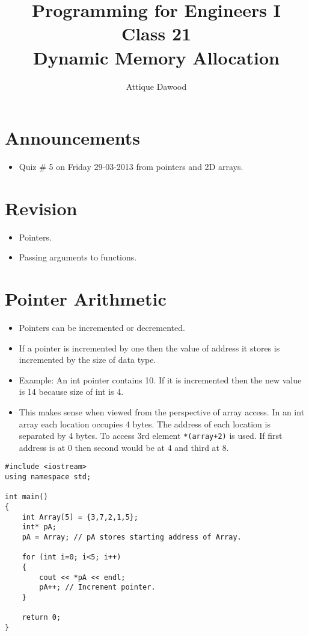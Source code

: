 \documentclass[12pt,a4paper]{article}
\title{\vspace{-2cm}Programming for Engineers I\\Class 21\\Dynamic Memory Allocation}
\author{Attique Dawood}
\begin{document}
\maketitle
\section{Announcements}
\begin{itemize}
\item Quiz \# 5 on Friday 29-03-2013 from pointers and 2D arrays.
\end{itemize}
\section{Revision}
\begin{itemize}
\item Pointers.
\item Passing arguments to functions.
\end{itemize}
\section{Pointer Arithmetic}
\begin{itemize}
\item Pointers can be incremented or decremented.
\item If a pointer is incremented by one then the value of address it stores is incremented by the size of data type.
\item Example: An int pointer contains 10. If it is incremented then the new value is 14 because size of int is 4.
\item This makes sense when viewed from the perspective of array access. In an int array each location occupies 4 bytes. The address of each location is separated by 4 bytes. To access 3rd element \verb|*(array+2)| is used. If first address is at 0 then second would be at 4 and third at 8.
\end{itemize} 
\begin{lstlisting}[caption={Pointer Arithmetic}]
#include <iostream>
using namespace std;

int main()
{
	int Array[5] = {3,7,2,1,5};
	int* pA;
	pA = Array; // pA stores starting address of Array.
	
	for (int i=0; i<5; i++)
	{
		cout << *pA << endl;
		pA++; // Increment pointer.
	}

	return 0;
}
\end{lstlisting}
\end{document}
